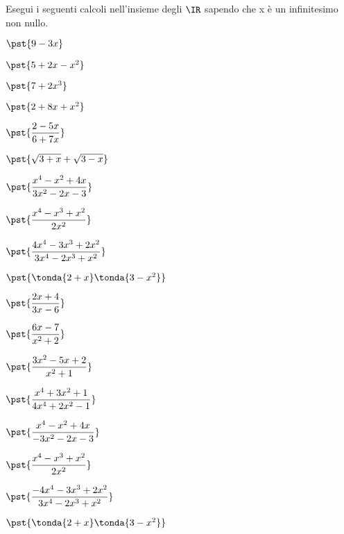 \begin{esercizio}\label{ese:iper_op_01}
Esegui i seguenti calcoli nell'insieme degli \(\IR\) sapendo che 
x è un infinitesimo non nullo.
\begin{multicols}{3}
\begin{enumeratea}
 \item \(\pst{9 -3x}\)
 \item \(\pst{5 +2x -x^2}\)
 \item \(\pst{7 +2x^3}\) 
 \item \(\pst{2+8x+x^2}\) 
 \item \(\pst{\dfrac{2-5x}{6 +7x}}\)
 \item \(\pst{\sqrt{3 +x} + \sqrt{3 -x}}\) 
 \item \(\pst{\dfrac{x^4 - x^2 + 4x}{3x^2 -2x -3}}\) 
 \item \(\pst{\dfrac{x^4 - x^3 + x^2}{2x^2}}\) 
 \item \(\pst{\dfrac{4x^4 - 3x^3 + 2x^2}{3x^4 -2x^3 +x^2}} \) 
 \item \(\pst{\tonda{2+x}\tonda{3-x^2}} \)  
% 
 \item \(\pst{\dfrac{2x +4}{3x-6}}\)
 \item \(\pst{\dfrac{6 x-7}{x^2 +2}}\)
 \item \(\pst{\dfrac{3x^2 -5x +2}{x^2 +1}}\)
 \item \(\pst{\dfrac{x^4 +3x^2 +1}{4x^4 +2x^2 -1}}\)
 \item \(\pst{\dfrac{x^4 - x^2 + 4x}{-3x^2 -2x -3}}\) 
 \item \(\pst{\dfrac{x^4 - x^3 + x^2}{2x^2}}\) 
 \item \(\pst{\dfrac{-4x^4 - 3x^3 + 2x^2}{3x^4 -2x^3 +x^2}} \) 
 \item \(\pst{\tonda{2+x}\tonda{3-x^2}} \)  
\end{enumeratea}
\end{multicols}
\end{esercizio}

